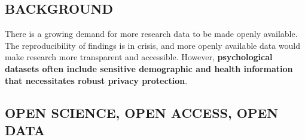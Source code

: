 \documentclass[a0,portrait]{a0poster}
\begin{document}
\begin{multicols}{3} %

\Large
\section{BACKGROUND}

There is a growing demand for more research data to be made openly available.
The reproducibility of findings is in crisis, and more openly available data would make research more transparent and accessible.
However, \textbf{psychological datasets often include sensitive demographic and health information that necessitates robust privacy protection}.

\subsection{OPEN SCIENCE, OPEN ACCESS, OPEN DATA}


\end{multicols}
\end{document}

